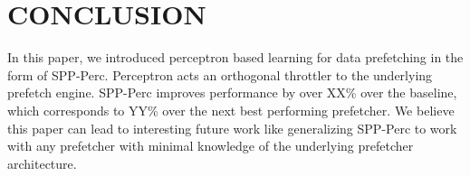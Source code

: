 \section{CONCLUSION}
In this paper, we introduced perceptron based learning for data
prefetching in the form of SPP-Perc.  Perceptron acts an orthogonal
throttler to the underlying prefetch engine.  SPP-Perc improves
performance by over XX\% over the baseline, which corresponds to YY\%
over the next best performing prefetcher.  We believe this paper can
lead to interesting future work like generalizing SPP-Perc to work
with any prefetcher with minimal knowledge of the underlying
prefetcher architecture.
